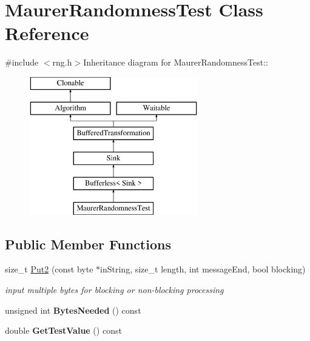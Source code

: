\hypertarget{class_maurer_randomness_test}{
\section{MaurerRandomnessTest Class Reference}
\label{class_maurer_randomness_test}
}


{\ttfamily \#include $<$rng.h$>$}Inheritance diagram for MaurerRandomnessTest::\begin{figure}[H]
\begin{center}
\leavevmode
\includegraphics[height=6cm]{class_maurer_randomness_test}
\end{center}
\end{figure}
\subsection*{Public Member Functions}
\begin{DoxyCompactItemize}
\item 
size\_\-t \hyperlink{class_maurer_randomness_test_ae2629df58de48eafc8b8d9f0b060ff98}{Put2} (const byte $\ast$inString, size\_\-t length, int messageEnd, bool blocking)
\begin{DoxyCompactList}\small\item\em input multiple bytes for blocking or non-\/blocking processing \item\end{DoxyCompactList}\item 
\hypertarget{class_maurer_randomness_test_a7f7aa3d6c32f96b395cbd9a564b06575}{
unsigned int {\bfseries BytesNeeded} () const }
\label{class_maurer_randomness_test_a7f7aa3d6c32f96b395cbd9a564b06575}

\item 
\hypertarget{class_maurer_randomness_test_a2f9006fd5ee013eeee7b8a4d905e322b}{
double {\bfseries GetTestValue} () const }
\label{class_maurer_randomness_test_a2f9006fd5ee013eeee7b8a4d905e322b}

\end{DoxyCompactItemize}


